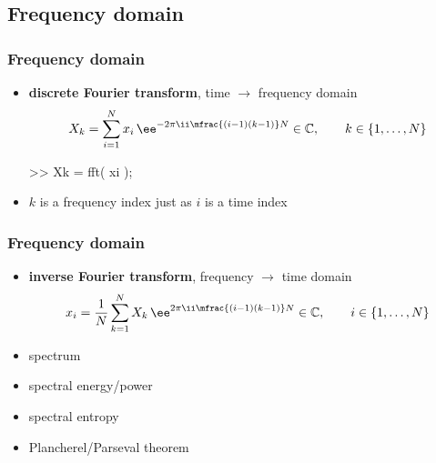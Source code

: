 
\subsection{Frequency domain}

\begin{frame}[fragile]
	\frametitle{Frequency domain}
	\begin{itemize}
		\item \textbf{discrete Fourier transform}, time $\rightarrow$ frequency domain
			\begin{align*}
				X_k=\sum_{i=1}^Nx_i\,\ee^{-2\pi\ii\mfrac{(i-1)(k-1)}N}\in\mathbb C,\qquad k\in\{1,\ldots,N\}
			\end{align*}
			\begin{code}
>> Xk = fft( xi );
			\end{code}
		\item $k$ is a frequency index just as $i$ is a time index
	\end{itemize}
\end{frame}

\begin{frame}
	\frametitle{Frequency domain}
	\begin{itemize}
		\item \textbf{inverse Fourier transform}, frequency $\rightarrow$ time domain
			\begin{align*}
				x_i=\frac1N\sum_{k=1}^NX_k\,\ee^{2\pi\ii\mfrac{(i-1)(k-1)}N}\in\mathbb C,\qquad i\in\{1,\ldots,N\}
			\end{align*}
		\item spectrum
		\item spectral energy/power
		\item spectral entropy
		\item Plancherel/Parseval theorem
	\end{itemize}
\end{frame}

